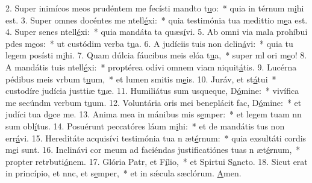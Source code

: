 2. Super inimícos meos prudéntem me fecísti mandto t\uline{u}o:~* quia in térnum m\uline{i}hi est.
3. Super omnes docéntes me ntell\uline{é}xi:~* quia testimónia tua medittio m\uline{e}a est.
4. Super senes ntell\uline{é}xi:~* quia mandáta ta quæs\uline{í}vi.
5. Ab omni via mala prohíbui pdes m\uline{e}os:~* ut custódim verba t\uline{u}a.
6. A judíciis tuis non dclin\uline{á}vi:~* quia tu legem posísti m\uline{i}hi.
7. Quam dúlcia fáucibus meis elóa t\uline{u}a,~* super ml ori m\uline{e}o!
8. A mandátis tuis ntell\uline{é}xi:~* proptérea odívi omnem viam niquit\uline{á}tis.
9. Lucérna pédibus meis vrbum t\uline{u}um,~* et lumen smitis m\uline{e}is.
10. Juráv, et st\uline{á}tui~* custodíre judícia justtiæ t\uline{u}æ.
11. Humiliátus sum usqueque, D\uline{ó}mine:~* vivífica me secúndm verbum t\uline{u}um.
12. Voluntária oris mei beneplácit fac, D\uline{ó}mine:~* et judíci tua d\uline{o}ce me.
13. Anima mea in mánibus mis s\uline{e}mper:~* et legem tuam nn sum obl\uline{í}tus.
14. Posuérunt peccatóres láum m\uline{i}hi:~* et de mandátis tus non err\uline{á}vi.
15. Hereditáte acquisívi testimónia tua n æt\uline{é}rnum:~* quia exsultáti cordis m\uline{e}i sunt.
16. Inclinávi cor meum ad faciéndas justificatiónes tuas n æt\uline{é}rnum,~* propter retrbuti\uline{ó}nem.
17. Glória Patr, et F\uline{í}lio,~* et Spirtui S\uline{a}ncto.
18. Sicut erat in princípio, et nnc, et s\uline{e}mper,~* et in sǽcula sæclórum. \uline{A}men.
